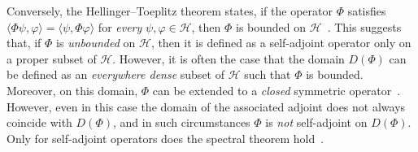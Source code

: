 \documentclass[leqno,onefignum,onetabnum]{siamltex1213}
\newcommand{\Hs}{\mathscr{H}}
\begin{document}
Conversely, the Hellinger--Toeplitz theorem states, if the operator
$\Phi$ satisfies $\langle\Phi\psi,\varphi\rangle=\langle\psi,\Phi\varphi\rangle$ for \emph{every} $\psi,\varphi\in\Hs$, then
$\Phi$ is bounded on $\Hs$~\cite{Reed-1980}. This suggests that, if $\Phi$
is \emph{unbounded} on $\Hs$, then it is defined as a self-adjoint
operator only on a proper subset of $\Hs$. However, it is often the
case that the domain $D(\Phi)$ can be defined as an \emph{everywhere
  dense} subset of $\Hs$ such that $\Phi$ is bounded. Moreover, on 
this domain, $\Phi$ can be extended to a \emph{closed} symmetric
operator~\cite{Reed-1980,Stone:64}. However, even in this case the
domain of the associated adjoint does not always coincide with $D(\Phi)$,
and in such circumstances $\Phi$ is \emph{not} self-adjoint on
$D(\Phi)$. Only for self-adjoint operators does the spectral theorem
hold~\cite{Reed-1980,Stone:64}. 
\end{document}
